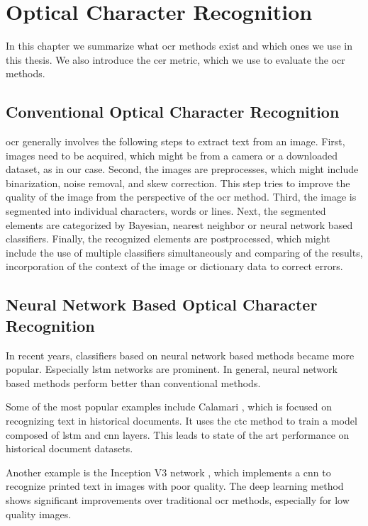 \chapter{Optical Character Recognition}
\label{chap:ocr}

In this chapter we summarize what \gls{ocr} methods exist and which ones we use in this thesis.
We also introduce the \gls{cer} metric, which we use to evaluate the \gls{ocr} methods.

\section{Conventional Optical Character Recognition}

\Gls{ocr} \cite{ocr_survey_2017} generally involves the following steps to extract text from an image.
First, images need to be acquired, which might be from a camera or a downloaded dataset, as in our case.
Second, the images are preprocesses, which might include binarization, noise removal, and skew correction.
This step tries to improve the quality of the image from the perspective of the \gls{ocr} method.
Third, the image is segmented into individual characters, words or lines.
Next, the segmented elements are categorized by Bayesian, nearest neighbor or neural network based classifiers.
Finally, the recognized elements are postprocessed, which might include the use of multiple classifiers simultaneously and comparing of the results, incorporation of the context of the image or dictionary data to correct errors.

\section{Neural Network Based Optical Character Recognition}

In recent years, classifiers based on neural network based methods \cite{ocr_survey_lstms_2013} became more popular.
Especially \gls{lstm} networks are prominent.
In general, neural network based methods perform better than conventional methods.

Some of the most popular examples include Calamari \cite{ocr_calamari_2018}, which is focused on recognizing text in historical documents.
It uses the \gls{ctc} method to train a model composed of \gls{lstm} and \gls{cnn} layers.
This leads to state of the art performance on historical document datasets.

Another example is the Inception V3 network \cite{ocr_improved_deep_2018}, which implements a \gls{cnn} to recognize printed text in images with poor quality.
The deep learning method shows significant improvements over traditional \gls{ocr} methods, especially for low quality images.

